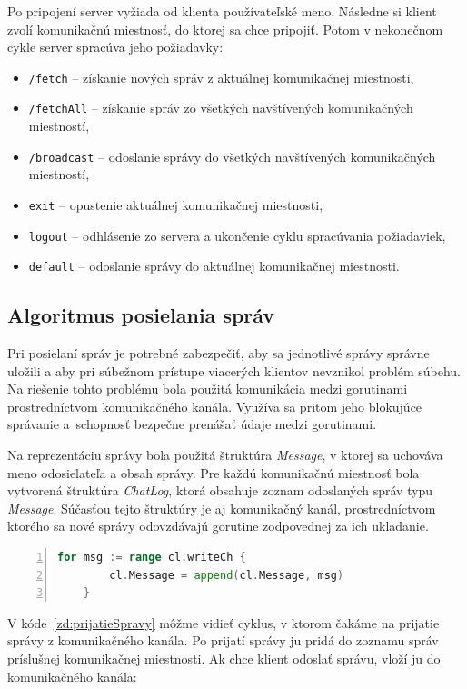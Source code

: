 \documentclass[
  biblatex,
  seconds=true,
  language=slovak,
  figures=false,
  urldate=iso,
  glossaries,
  index
]{kidiplom}
\begin{document}
Po pripojení server vyžiada od klienta používateľské meno. Následne si klient zvolí komunikačnú miestnosť, do ktorej sa chce pripojiť. Potom v nekonečnom cykle server spracúva jeho požiadavky:
\newpage
\begin{itemize}
	\item \texttt{/fetch} -- získanie nových správ z aktuálnej komunikačnej miestnosti,
	\item \texttt{/fetchAll} -- získanie správ zo všetkých navštívených komunikačných miestností,
	\item \texttt{/broadcast} -- odoslanie správy do všetkých navštívených komunikačných miestností,
	\item \texttt{exit} -- opustenie aktuálnej komunikačnej miestnosti,
	\item \texttt{logout} -- odhlásenie zo servera a ukončenie cyklu spracúvania požiadaviek,
	\item \texttt{default} -- odoslanie správy do aktuálnej komunikačnej miestnosti.
\end{itemize}

\subsection{Algoritmus posielania správ}

Pri posielaní správ je potrebné zabezpečiť, aby sa jednotlivé správy správne uložili a aby pri súbežnom prístupe viacerých klientov nevznikol problém súbehu. Na riešenie tohto problému bola použitá komunikácia medzi gorutinami prostredníctvom komunikačného kanála. Využíva sa pritom jeho blokujúce správanie a~schopnosť bezpečne prenášať údaje medzi gorutinami.

Na reprezentáciu správy bola použitá štruktúra \emph{Message}, v ktorej sa uchováva meno odosielateľa a obsah správy. Pre každú komunikačnú miestnosť bola vytvorená štruktúra \emph{ChatLog}, ktorá obsahuje zoznam odoslaných správ typu \emph{Message}. Súčasťou tejto štruktúry je aj komunikačný kanál, prostredníctvom ktorého sa nové správy odovzdávajú gorutine zodpovednej za ich ukladanie.

\begin{lstlisting}[language=Go,numbers=left, caption={Prijatie správy}, captionpos=b, label={zd:prijatieSpravy}]
	for msg := range cl.writeCh {
		cl.Message = append(cl.Message, msg)
	}
\end{lstlisting}

V kóde~\ref{zd:prijatieSpravy} môžme vidieť cyklus, v ktorom čakáme na prijatie správy z komunikačného kanála. Po prijatí správy ju pridá do zoznamu správ príslušnej komunikačnej miestnosti. Ak chce klient odoslať správu, vloží ju do komunikačného kanála:
\end{document}

